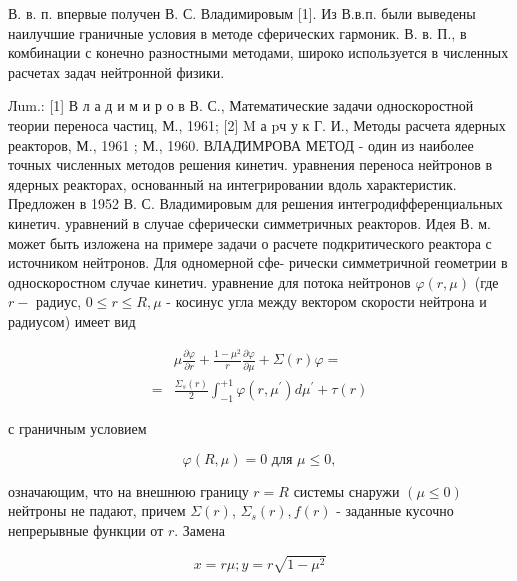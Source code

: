\documentclass[10pt]{article}
\begin{document}
В. в. п. впервые получен В. С. Владимировым [1]. Из В.в.п. были выведены наилучшие граничные условия в методе сферических гармоник. В. в. П., в комбинации с конечно разностными методами, широко используется в численных расчетах задач нейтронной физики.



Лum.: [1] В л а д и м и р о в В. С., Математические задачи односкоростной теории переноса частиц, М., 1961; [2] M а pч у к Г. И., Методы расчета ядерных реакторов, М., 1961 ; М., 1960. ВЛАД̆ИМРОВА МЕТОД - один из наиболее точных численных методов решения кинетич. уравнения переноса нейтронов в ядерных реакторах, основанный на интегрировании вдоль характеристик. Предложен в 1952 В. С. Владимировым для решения интегродифференциальных кинетич. уравнений в случае сферически симметричных реакторов. Идея В. м. может быть изложена на примере задачи о расчете подкритического реактора с источником нейтронов. Для одномерной сфе- рически симметричной геометрии в односкоростном случае кинетич. уравнение для потока нейтронов $\varphi(r, \mu)$ (где $r-$ радиус, $0 \leqslant r \leqslant R, \mu$ - косинус угла между вектором скорости нейтрона и радиусом) имеет вид



\[

\begin{aligned}

& \mu \frac{\partial \varphi}{\partial r}+\frac{1-\mu^{2}}{r} \frac{\partial \varphi}{\partial \mu}+\Sigma(r) \varphi= \\

= & \frac{\Sigma_{s}(r)}{2} \int_{-1}^{+1} \varphi\left(r, \mu^{\prime}\right) d \mu^{\prime}+\tau(r)

\end{aligned}

\]



с граничным условием



\[

\varphi(R, \mu)=0 \text { для } \mu \leqslant 0,

\]



означающим, что на внешнюю границу $r=R$ системы снаружи $(\mu \leqslant 0)$ нейтроны не падают, причем $\Sigma(r)$, $\Sigma_{s}(r), f(r)$ - заданные кусочно непрерывные функции от $r$. Замена



\[

x=r \mu ; y=r \sqrt{1-\mu^{2}}

\]
\end{document}

